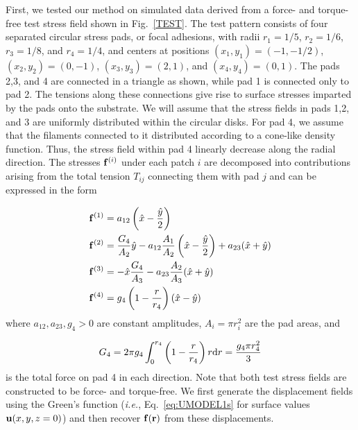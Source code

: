 \documentclass[aps,prl,reprint,twocolumn,groupedaddress,showpacs]{revtex4}
\def\dd{\mbox{d}}
\def\f{{\bf f}}
\def\r{{\bf r}}
\def\u{{\bf u}}
\begin{document}
First, we tested our method on simulated data derived from a force-
and torque-free test stress field shown in Fig.~\ref{TEST}. The test
pattern consists of four separated circular stress pads, or focal
adhesions, with radii $r_{1} = 1/5$, $r_{2} = 1/6$, $r_{3} = 1/8$, and
$r_{4} = 1/4$, and centers at positions $(x_{1},y_{1}) = (-1,-1/2)$,
$(x_{2},y_{2}) = (0,-1)$, $(x_{3},y_{3}) = (2,1)$, and $(x_{4},y_{4})
= (0,1)$.  The pads 2,3, and 4 are connected in a triangle as shown,
while pad 1 is connected only to pad 2.  The tensions along these
connections give rise to surface stresses imparted by the pads onto
the substrate.  We will assume that the stress fields in pads 1,2, and
3 are uniformly distributed within the circular disks. For pad 4, we
assume that the filaments connected to it distributed according to a
cone-like density function. Thus, the stress field within pad 4
linearly decrease along the radial direction. The stresses $\f^{(i)}$
under each patch $i$ are decomposed into contributions arising from
the total tension $T_{ij}$ connecting them with pad $j$ and can be
expressed in the form

\begin{align}
\f^{(1)} & = a_{12}\left(\hat{x} -{\hat{y}\over 2}\right) \label{SIGMA1}\\
\f^{(2)} & = {G_{4}\over A_{2}}\hat{y} - a_{12}{A_{1}\over A_{2}}\left(\hat{x} 
-{\hat{y}\over 2}\right) + a_{23}(\hat{x}+\hat{y}) \label{SIGMA2} \\
\f^{(3)} & = -\hat{x}{G_{4}\over A_{3}} - a_{23}{A_{2}\over A_{3}}(\hat{x}+\hat{y}) 
\label{SIGMA3}\\
\f^{(4)} & = g_{4}\left(1- {r \over r_{4}}\right)(\hat{x}-\hat{y})\label{SIGMA4}
\end{align}
%
where $a_{12}, a_{23}, g_{4} >0$ are constant amplitudes, 
$A_{i} = \pi r_{i}^{2}$ are the pad areas, and 

\begin{equation}
G_{4} = 2\pi g_{4}\int_{0}^{r_{4}}\left(1-{r\over r_{4}}\right)r\dd r = {g_{4}\pi r_{4}^{2}\over 3}
\end{equation}
%
is the total force on pad 4 in each direction. Note that both test
stress fields are constructed to be force- and torque-free. We first
generate the displacement fields using the Green's function 
(\textit{i.e.}, Eq.~\ref{eq:UMODEL1s} for surface values $\u(x,y,z=0)$)
and then recover $\f(\r)$ from these displacements.

%
\end{document}
